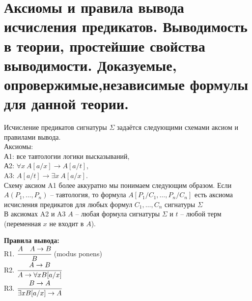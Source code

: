 \section{Аксиомы и правила вывода исчисления предикатов. Выводимость в теории, простейшие свойства выводимости.
Доказуемые, опровержимые,независимые формулы для данной теории.}
Исчисление предикатов сигнатуры $\Sigma$ задаётся следующими схемами аксиом и правилами вывода.\\
Аксиомы:\\
А1: все тавтологии логики высказываний,\\
А2: $\forall x \ A[a/x] \rightarrow A[a/t]$,\\
A3: $A[a/t] \rightarrow \exists x \ A[a/x]$. \\
Схему аксиом A1 более аккуратно мы понимаем следующим образом. Если $A(P_1,\ldots,P_n)$ -- тавтология, то формула
$A[P_1/C_1,\ldots,P_n/C_n]$ есть аксиома исчисления предикатов для любых формул $C_1,\ldots,C_n$ сигнатуры
$\Sigma$\\
В аксиомах A2 и A3 $A$ -- любая формула сигнатуры $\Sigma$ и $t$ -- любой терм (переменная $x$ не входит в $A$).

\textbf{Правила вывода:}\\
R1. $\cfrac{A \quad A \rightarrow B}{B}$ (modus ponens)\\ \medskip 
R2. $\cfrac{A \rightarrow B}{A \rightarrow \forall x B[a / x]}$\\ \medskip 
R3. $\cfrac{B \rightarrow A}{\exists x B[a / x] \rightarrow A}$

